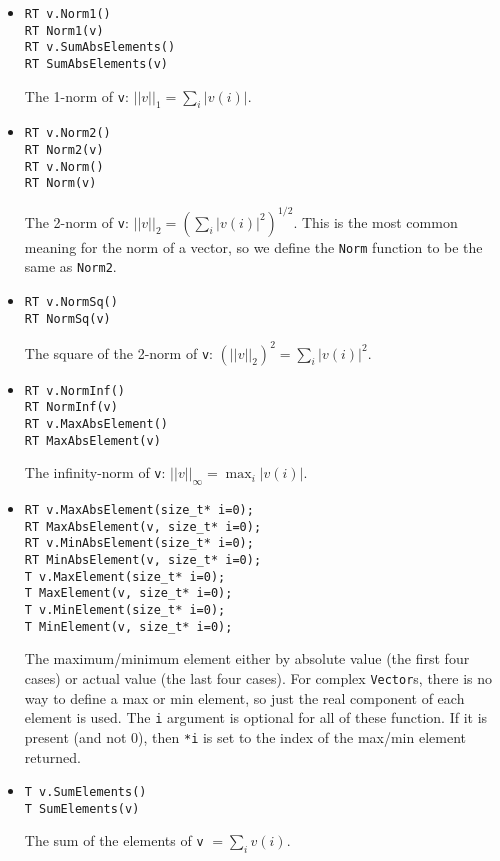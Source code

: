 \documentclass[twoside,letterpaper,11pt]{article}
\renewcommand{\tt}[1]{{\texttt {#1}}}
\begin{document}
\begin{itemize}

\item
\begin{verbatim}
RT v.Norm1()
RT Norm1(v)
RT v.SumAbsElements()
RT SumAbsElements(v)
\end{verbatim}
The 1-norm of \tt{v}: $||v||_1 = \sum_i |v(i)|$.

\item
\begin{verbatim}
RT v.Norm2()
RT Norm2(v)
RT v.Norm()
RT Norm(v)
\end{verbatim}
The 2-norm of \tt{v}: $||v||_2 = (\sum_i |v(i)|^2)^{1/2}$.
This is the most common meaning for the norm of a vector, so we
define the \tt{Norm} function to be the same as \tt{Norm2}.

\item
\begin{verbatim}
RT v.NormSq()
RT NormSq(v)
\end{verbatim}
The square of the 2-norm of \tt{v}: $(||v||_2)^2 = \sum_i |v(i)|^2$.

\item
\begin{verbatim}
RT v.NormInf()
RT NormInf(v)
RT v.MaxAbsElement()
RT MaxAbsElement(v)
\end{verbatim}
The infinity-norm of \tt{v}: $||v||_\infty = \max_i |v(i)|$.

\item
\begin{verbatim}
RT v.MaxAbsElement(size_t* i=0);
RT MaxAbsElement(v, size_t* i=0);
RT v.MinAbsElement(size_t* i=0);
RT MinAbsElement(v, size_t* i=0);
T v.MaxElement(size_t* i=0);
T MaxElement(v, size_t* i=0);
T v.MinElement(size_t* i=0);
T MinElement(v, size_t* i=0);
\end{verbatim}
The maximum/minimum element either by absolute value (the first four cases) or actual value
(the last four cases).  For complex \tt{Vector}s, there is no way to define a 
max or min element, so just the real component of each element is used.
The \tt{i} argument is optional for all of these function.  
If it is present (and not 0), then \tt{*i} is set to the 
index of the max/min element returned.

\item
\begin{verbatim}
T v.SumElements()
T SumElements(v)
\end{verbatim}
The sum of the elements of \tt{v} $= \sum_i v(i)$.

\end{itemize}
\end{document}
